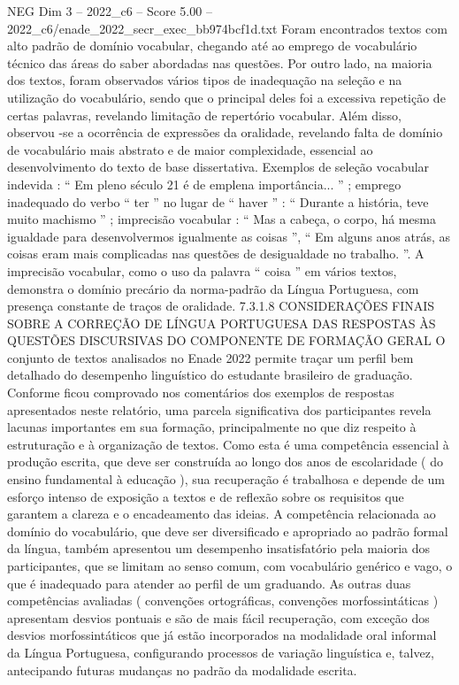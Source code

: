 \begin{textsample}{NEG Dim 3 – 2022\_c6 – Score 5.00 – 2022\_c6/enade\_2022\_secr\_exec\_bb974bcf1d.txt}
Foram encontrados textos com alto padrão de domínio vocabular, chegando até ao emprego de vocabulário técnico das áreas do saber abordadas nas questões.
Por outro lado, na maioria dos textos, foram observados vários tipos de inadequação na seleção e na utilização do vocabulário, sendo que o principal deles foi a excessiva repetição de certas palavras, revelando limitação de repertório vocabular.
Além disso, observou -se a ocorrência de expressões da oralidade, revelando falta de domínio de vocabulário mais abstrato e de maior complexidade, essencial ao desenvolvimento do texto de base dissertativa.
Exemplos de seleção vocabular indevida : “ Em pleno século 21 é de emplena importância... ” ; emprego inadequado do verbo “ ter ” no lugar de “ haver ” : “ Durante a história, teve muito machismo ” ; imprecisão vocabular : “ Mas a cabeça, o corpo, há mesma igualdade para desenvolvermos igualmente as coisas ”, “ Em alguns anos atrás, as coisas eram mais complicadas nas questões de desigualdade no trabalho. ”.
A imprecisão vocabular, como o uso da palavra “ coisa ” em vários textos, demonstra o domínio precário da norma-padrão da Língua Portuguesa, com presença constante de traços de oralidade. 7.3.1.8 CONSIDERAÇÕES FINAIS SOBRE A CORREÇÃO DE LÍNGUA PORTUGUESA DAS RESPOSTAS ÀS QUESTÕES DISCURSIVAS DO COMPONENTE DE FORMAÇÃO GERAL O conjunto de textos analisados no Enade 2022 permite traçar um perfil bem detalhado do desempenho linguístico do estudante brasileiro de graduação.
Conforme ficou comprovado nos comentários dos exemplos de respostas apresentados neste relatório, uma parcela significativa dos participantes revela lacunas importantes em sua formação, principalmente no que diz respeito à estruturação e à organização de textos.
Como esta é uma competência essencial à produção escrita, que deve ser construída ao longo dos anos de escolaridade ( do ensino fundamental à educação ), sua recuperação é trabalhosa e depende de um esforço intenso de exposição a textos e de reflexão sobre os requisitos que garantem a clareza e o encadeamento das ideias.
A competência relacionada ao domínio do vocabulário, que deve ser diversificado e apropriado ao padrão formal da língua, também apresentou um desempenho insatisfatório pela maioria dos participantes, que se limitam ao senso comum, com vocabulário genérico e vago, o que é inadequado para atender ao perfil de um graduando.
As outras duas competências avaliadas ( convenções ortográficas, convenções morfossintáticas ) apresentam desvios pontuais e são de mais fácil recuperação, com exceção dos desvios morfossintáticos que já estão incorporados na modalidade oral informal da Língua Portuguesa, configurando processos de variação linguística e, talvez, antecipando futuras mudanças no padrão da modalidade escrita.

\end{textsample}
